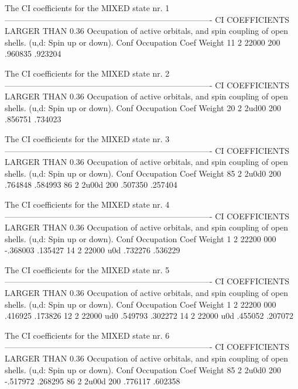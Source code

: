 \begin{sourcelisting}
  The CI coefficients for the MIXED state nr.	1
 ----------------------------------------------------------------------------
 CI COEFFICIENTS LARGER THAN 0.36      
  Occupation of active orbitals, and spin coupling
  of open shells. (u,d: Spin up or down).
   Conf Occupation	  Coef		Weight
     11	 2 22000 200	.960835       .923204

  The CI coefficients for the MIXED state nr.	2
 ----------------------------------------------------------------------------
 CI COEFFICIENTS LARGER THAN 0.36      
  Occupation of active orbitals, and spin coupling
  of open shells. (u,d: Spin up or down).
   Conf Occupation	  Coef		Weight
     20	 2 2ud00 200	.856751        .734023

  The CI coefficients for the MIXED state nr.	3
 ----------------------------------------------------------------------------
 CI COEFFICIENTS LARGER THAN 0.36      
  Occupation of active orbitals, and spin coupling
  of open shells. (u,d: Spin up or down).
   Conf Occupation	  Coef		Weight
     85	 2 2u0d0 200	.764848        .584993
     86	 2 2u00d 200	.507350	       .257404

  The CI coefficients for the MIXED state nr.	4
 ----------------------------------------------------------------------------
 CI COEFFICIENTS LARGER THAN 0.36      
  Occupation of active orbitals, and spin coupling
  of open shells. (u,d: Spin up or down).
   Conf Occupation	  Coef		Weight
      1	 2 22200 000   -.368003	       .135427
     14	 2 22000 u0d	.732276	       .536229

  The CI coefficients for the MIXED state nr.	5
 ----------------------------------------------------------------------------
 CI COEFFICIENTS LARGER THAN 0.36      
  Occupation of active orbitals, and spin coupling
  of open shells. (u,d: Spin up or down).
   Conf Occupation	  Coef		Weight
      1	 2 22200 000	.416925	       .173826
     12	 2 22000 ud0	.549793	       .302272
     14	 2 22000 u0d	.455052	       .207072

  The CI coefficients for the MIXED state nr.	6
 ----------------------------------------------------------------------------
 CI COEFFICIENTS LARGER THAN 0.36      
  Occupation of active orbitals, and spin coupling
  of open shells. (u,d: Spin up or down).
   Conf Occupation	  Coef		Weight
     85	 2 2u0d0 200    -.517972       .268295
     86	 2 2u00d 200     .776117       .602358
\end{sourcelisting}


